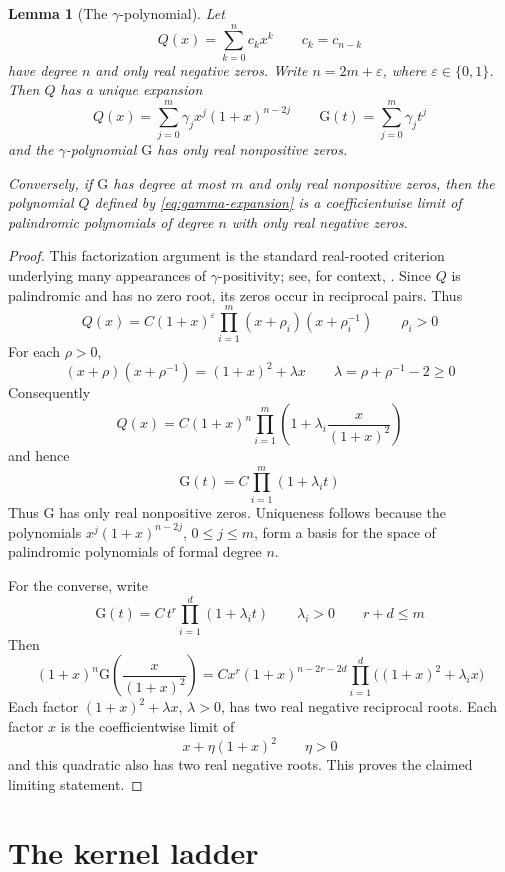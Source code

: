 \documentclass[a4paper,11pt,reqno]{amsart}
\numberwithin{equation}{section}
\newtheorem{lemma}{Lemma}
\theoremstyle{remark}
\newcommand{\Gpoly}{\mathrm{G}}     %
\begin{document}
\begin{lemma}[The \(\gamma\)-polynomial]\label{lem:gamma}
Let
\[
  Q(x)=\sum_{k=0}^{n}c_kx^k
  \qquad c_k=c_{n-k}
\]
have degree \(n\) and only real negative zeros. Write \(n=2m+\varepsilon\), where \(\varepsilon\in\{0,1\}\). Then \(Q\) has a unique expansion
\begin{equation}\label{eq:gamma-expansion}
  Q(x)=\sum_{j=0}^{m}\gamma_jx^j(1+x)^{n-2j}
  \qquad
  \Gpoly(t)=\sum_{j=0}^{m}\gamma_jt^j
\end{equation}
and the \(\gamma\)-polynomial \(\Gpoly\) has only real nonpositive zeros.

Conversely, if \(\Gpoly\) has degree at most \(m\) and only real nonpositive zeros, then the polynomial \(Q\) defined by \eqref{eq:gamma-expansion} is a coefficientwise limit of palindromic polynomials of degree \(n\) with only real negative zeros.
\end{lemma}

\begin{proof}
This factorization argument is the standard real-rooted criterion underlying many appearances of \(\gamma\)-positivity; see, for context, \cite{FoataSchutzenberger,Athanasiadis2018}. Since \(Q\) is palindromic and has no zero root, its zeros occur in reciprocal pairs. Thus
\[
  Q(x)=
  C(1+x)^\varepsilon
  \prod_{i=1}^{m}(x+\rho_i)(x+\rho_i^{-1})
  \qquad \rho_i>0
\]
For each \(\rho>0\),
\[
  (x+\rho)(x+\rho^{-1})
  =
  (1+x)^2+\lambda x
  \qquad
  \lambda=\rho+\rho^{-1}-2\geq0
\]
Consequently
\[
  Q(x)=
  C(1+x)^n
  \prod_{i=1}^{m}
  \left(
    1+\lambda_i\frac{x}{(1+x)^2}
  \right)
\]
and hence
\[
  \Gpoly(t)=
  C\prod_{i=1}^{m}(1+\lambda_it)
\]
Thus \(\Gpoly\) has only real nonpositive zeros. Uniqueness follows because the polynomials \(x^j(1+x)^{n-2j}\), \(0\leq j\leq m\), form a basis for the space of palindromic polynomials of formal degree \(n\).

For the converse, write
\[
  \Gpoly(t)=C\,t^r\prod_{i=1}^{d}(1+\lambda_it)
  \qquad
  \lambda_i>0
  \qquad
  r+d\leq m
\]
Then
\[
  (1+x)^n\Gpoly\left(\frac{x}{(1+x)^2}\right)
  =
  Cx^r(1+x)^{n-2r-2d}
  \prod_{i=1}^{d}\bigl((1+x)^2+\lambda_ix\bigr)
\]
Each factor \((1+x)^2+\lambda x\), \(\lambda>0\), has two real negative reciprocal roots. Each factor \(x\) is the coefficientwise limit of
\[
  x+\eta(1+x)^2
  \qquad \eta>0
\]
and this quadratic also has two real negative roots. This proves the claimed limiting statement.
\end{proof}

\section{The kernel ladder}
\end{document}
